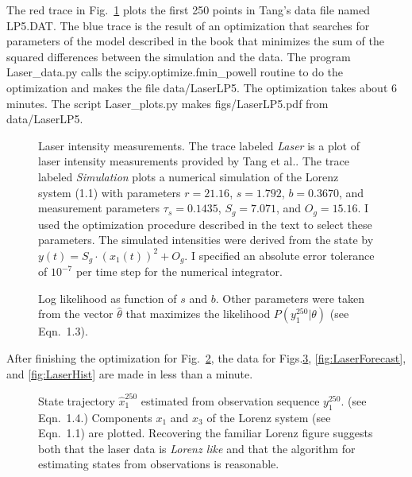 \documentclass[prelim,showlabels]{book}
\newcommand{\s}{{\bf s}}
\newcommand{\Tsamp}{\tau_s }
\newcommand{\ti}[2]{{#1}{(#2)}}                  %
\newcommand{\ts}[3]{#1_{#2}^{#3}}                    %
\newcommand{\etal}{et al.\xspace}
\newcommand{\plotsize}{\small}
\begin{document}
The red trace in Fig.~\ref{fig:LaserLP5} plots the first 250 points in
Tang's data file named LP5.DAT.  The blue trace is the result of an
optimization that searches for parameters of the model described in
the book that minimizes the sum of the squared differences between the
simulation and the data.  The program Laser\_data.py calls the
scipy.optimize.fmin\_powell routine to do the optimization and makes
the file data/LaserLP5.  The optimization takes about 6 minutes.  The
script Laser\_plots.py makes figs/LaserLP5.pdf from data/LaserLP5.
\begin{figure}[htbp]
  \centering{
  }
  \caption[Laser intensity measurements.]%
  {Laser intensity measurements.  The trace labeled \emph{Laser} is a
    plot of laser intensity measurements provided by Tang \etal.  The
    trace labeled \emph{Simulation} plots a numerical simulation of
    the Lorenz system (1.1) with parameters $r=21.16$,
    $s=1.792$, $b=0.3670$, and measurement parameters $\Tsamp=0.1435$,
    $S_g = 7.071$, and $O_g =15.16$.  I used the optimization
    procedure described in the text to select these parameters.  The
    simulated intensities were derived from the state by $\ti{y}{t} =
    S_g \cdot (\ti{x_1}{t})^2 + O_g$.  I specified an absolute error
    tolerance of $10^{-7}$ per time step for the numerical
    integrator.}
  \label{fig:LaserLP5}
\end{figure}

\begin{figure}[htbp]
  \centering{\plotsize%
    \def\l#1{\mbox{\lower1.5ex\hbox{$#1$}}}%
    \def\s{\mbox{\kern2.0em\lower2.0ex\hbox{$s$}}}%
    \def\b{\mbox{\lower1.5ex\hbox{$b$}}}%
    \def\LogLikely{$\log\left(P(\ts{y}{1}{250}|\theta) \right)$}%
%    
  }
  \caption{Log likelihood as function of $s$ and $b$.  Other parameters were
    taken from the vector $\hat \theta$ that maximizes the likelihood
    $P(\ts{y}{1}{250}|\theta)$ (see Eqn.~1.3).}
  \label{fig:LaserLogLike}
\end{figure}

After finishing the optimization for Fig.~\ref{fig:LaserLogLike}, the
data for Figs.\ref{fig:LaserStates}, \ref{fig:LaserForecast}, and
\ref{fig:LaserHist} are made in less than a minute.
\begin{figure}[htbp]
  \centering{
  }
  \caption[State trajectory $\ts{\hat
    x}{1}{250}$.]%
  {State trajectory $\ts{\hat x}{1}{250}$ estimated from observation
    sequence $\ts{y}{1}{250}$. (see Eqn.~1.4.)
    Components $x_1$ and $x_3$ of the Lorenz system (see
    Eqn.~1.1) are plotted.  Recovering the familiar
    Lorenz figure suggests both that the laser data is \emph{Lorenz
      like} and that the algorithm for estimating states from
    observations is reasonable.}
  \label{fig:LaserStates}
\end{figure}
\end{document}
